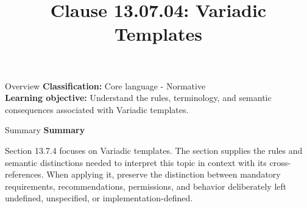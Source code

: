 \documentclass[10pt,letterpaper]{article}
\title{Clause 13.07.04: Variadic Templates}
\author{}
\date{}
\begin{document}
\maketitle
\begin{CornellOverviewBox}{Overview}
\textbf{Classification:} Core language - Normative\\[2pt]
\textbf{Learning objective:} Understand the rules, terminology, and semantic consequences associated with Variadic templates.
\end{CornellOverviewBox}\begin{CornellSummaryBox}{Summary}
{\sffamily\bfseries\color{Accent} Summary}\par\vspace{3pt}Section 13.7.4 focuses on Variadic templates. The section supplies the rules and semantic distinctions needed to interpret this topic in context with its cross-references. When applying it, preserve the distinction between mandatory requirements, recommendations, permissions, and behavior deliberately left undefined, unspecified, or implementation-defined.
\end{CornellSummaryBox}
\end{document}
